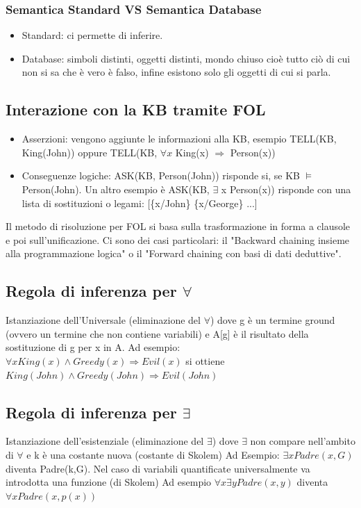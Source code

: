 \documentclass{article}
\begin{document}
\subsubsection{Semantica Standard VS Semantica Database}
\begin{itemize}
    \item Standard: ci permette di inferire.
    \item Database: simboli distinti, oggetti distinti, mondo chiuso cioè tutto ciò di cui non si sa che è vero è falso, infine esistono solo gli oggetti di cui si parla.
\end{itemize}

\subsection{Interazione con la KB tramite FOL}
\begin{itemize}
    \item Asserzioni: vengono aggiunte le informazioni alla KB, esempio TELL(KB, King(John)) oppure TELL(KB, $\forall x$ King(x) $\Rightarrow$ Person(x))
    \item Conseguenze logiche: ASK(KB, Person(John)) risponde si, se KB $\models$ Person(John). Un altro esempio è ASK(KB, $\exists$ x Person(x)) risponde con una lista di sostituzioni o legami: [\{x/John\} \{x/George\} ...]
\end{itemize}
Il metodo di risoluzione per FOL si basa sulla trasformazione in forma a clausole e poi sull'unificazione. Ci sono dei casi particolari: il "Backward chaining insieme alla programmazione logica" o il "Forward chaining con basi di dati deduttive".

\subsection{Regola di inferenza per $\forall$}
Istanziazione dell’Universale (eliminazione del $\forall$) \quad
{} \newline
dove g è un termine ground (ovvero un termine che non contiene variabili) e A[g] è il risultato della sostituzione di g per x in A.\newline
Ad esempio: $\forall x King(x) \land Greedy(x) \Rightarrow Evil(x)$ si ottiene $ King(John) \land Greedy(John) \Rightarrow Evil(John)$

\subsection{Regola di inferenza per $\exists$}
Istanziazione dell'esistenziale (eliminazione del $\exists$) \quad 
{} \newline
dove $\exists$ non compare nell'ambito di $\forall$ e k è una costante nuova (costante di Skolem) \newline
Ad Esempio: $\exists x Padre(x,G)$ diventa Padre(k,G). \newline
Nel caso di variabili quantificate universalmente va introdotta una funzione (di Skolem) \newline
Ad esempio $\forall x \exists y Padre(x, y)$ diventa $\forall x Padre(x, p(x))$
\end{document}
